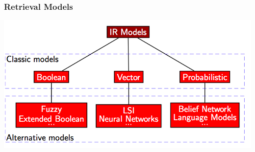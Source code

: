 \documentclass[svgnames]{beamer}
\begin{document}





\begin{frame}
    \frametitle{Retrieval Models}

    \begin{center}
        \includegraphics[width=.8\linewidth]{retrieval-models.png}\\
    \end{center}

\end{frame}
\end{document}
